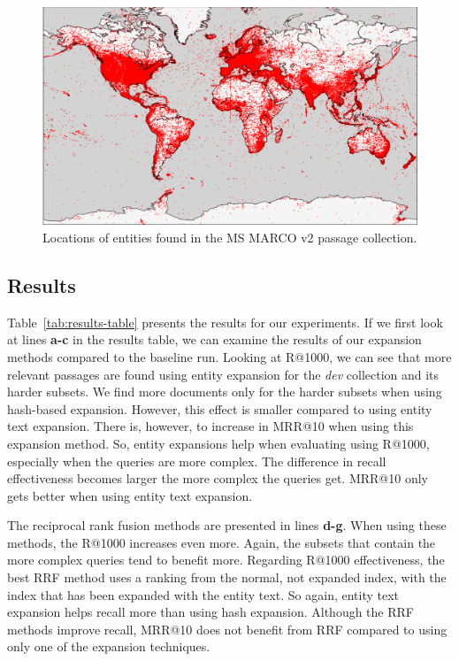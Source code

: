 \begin{figure}[!t]
\centering
\includegraphics[width=.9\textwidth]{imgs/demo.png}
\caption{Locations of entities found in the MS MARCO v2 passage collection.}
\label{fig:entity_map}
\end{figure}



\subsection{Results}
Table~\ref{tab:results-table} presents the results for our experiments. If we first look at lines \textbf{a-c} in the results table, we can examine the results of our expansion methods compared to the baseline run. Looking at R@1000, we can see that more relevant passages are found using entity expansion for the \emph{dev} collection and its harder subsets. We find more documents only for the harder subsets when using hash-based expansion. However, this effect is smaller compared to using entity text expansion. There is, however, to increase in MRR@10 when using this expansion method. So, entity expansions help when evaluating using R@1000, especially when the queries are more complex. The difference in recall effectiveness becomes larger the more complex the queries get. MRR@10 only gets better when using entity text expansion. 

The reciprocal rank fusion methods are presented in lines \textbf{d-g}. When using these methods, the R@1000 increases even more. Again, the subsets that contain the more complex queries tend to benefit more. Regarding R@1000 effectiveness, the best RRF method uses a ranking from the normal, not expanded index, with the index that has been expanded with the entity text. So again, entity text expansion helps recall more than using hash expansion. Although the RRF methods improve recall, MRR@10 does not benefit from RRF compared to using only one of the expansion techniques. 

